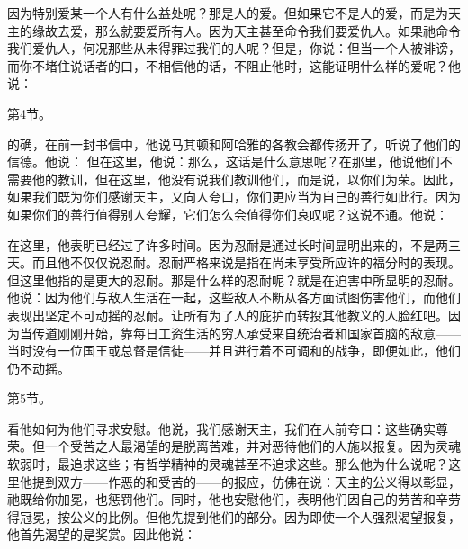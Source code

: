 因为特别爱某一个人有什么益处呢？那是人的爱。但如果它不是人的爱，而是为天主的缘故去爱，那么就要爱所有人。因为天主甚至命令我们要爱仇人。如果祂命令我们爱仇人，何况那些从未得罪过我们的人呢？但是，你说：但当一个人被诽谤，而你不堵住说话者的口，不相信他的话，不阻止他时，这能证明什么样的爱呢？他说：\par

第4节。\newline{}\par

的确，在前一封书信中，他说马其顿和阿哈雅的各教会都传扬开了，听说了他们的信德。他说：\newline{} 但在这里，他说：那么，这话是什么意思呢？在那里，他说他们不需要他的教训，但在这里，他没有说我们教训他们，而是说，以你们为荣。因此，如果我们既为你们感谢天主，又向人夸口，你们更应当为自己的善行如此行。因为如果你们的善行值得别人夸耀，它们怎么会值得你们哀叹呢？这说不通。他说：\par

在这里，他表明已经过了许多时间。因为忍耐是通过长时间显明出来的，不是两三天。而且他不仅仅说忍耐。忍耐严格来说是指在尚未享受所应许的福分时的表现。但这里他指的是更大的忍耐。那是什么样的忍耐呢？就是在迫害中所显明的忍耐。他说：因为他们与敌人生活在一起，这些敌人不断从各方面试图伤害他们，而他们表现出坚定不可动摇的忍耐。让所有为了人的庇护而转投其他教义的人脸红吧。因为当传道刚刚开始，靠每日工资生活的穷人承受来自统治者和国家首脑的敌意——当时没有一位国王或总督是信徒——并且进行着不可调和的战争，即便如此，他们仍不动摇。\par

第5节。\newline{}\par

看他如何为他们寻求安慰。他说，我们感谢天主，我们在人前夸口：这些确实尊荣。但一个受苦之人最渴望的是脱离苦难，并对恶待他们的人施以报复。因为灵魂软弱时，最追求这些；有哲学精神的灵魂甚至不追求这些。那么他为什么说呢？这里他提到双方——作恶的和受苦的——的报应，仿佛在说：天主的公义得以彰显，祂既给你加冕，也惩罚他们。同时，他也安慰他们，表明他们因自己的劳苦和辛劳得冠冕，按公义的比例。但他先提到他们的部分。因为即使一个人强烈渴望报复，他首先渴望的是奖赏。因此他说：\par

